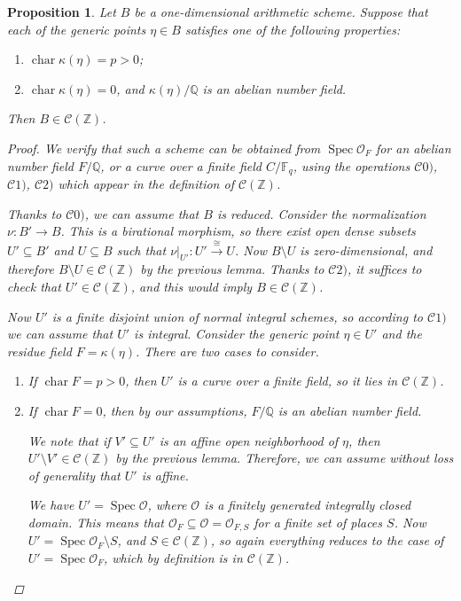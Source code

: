 \documentclass[10pt,a4paper,oneside,draft]{article}
\DeclareMathOperator{\fchar}{char}
\DeclareMathOperator{\Spec}{Spec}
\newcommand{\FF}{\mathbb{F}}
\newcommand{\QQ}{\mathbb{Q}}
\newcommand{\ZZ}{\mathbb{Z}}
\theoremstyle{myplain}
\newtheorem{proposition}[theorem]{Proposition}
\theoremstyle{mydefinition}
\numberwithin{equation}{section}
\begin{document}
\begin{proposition}
  \label{prop:particular-cases-1-dim-base}
  Let $B$ be a one-dimensional arithmetic scheme. Suppose that each of the
  generic points $\eta \in B$ satisfies one of the following properties:
  \begin{enumerate}
  \item[a)] $\fchar \kappa (\eta) = p > 0$;

  \item[b)] $\fchar \kappa (\eta) = 0$, and $\kappa (\eta)/\QQ$ is an abelian
    number field.
  \end{enumerate}
  Then $B \in \mathcal{C} (\ZZ)$.

  \begin{proof}
    We verify that such a scheme can be obtained from $\Spec \mathcal{O}_F$ for
    an abelian number field $F/\QQ$, or a curve over a finite field $C/\FF_q$,
    using the operations $\mathcal{C}0)$, $\mathcal{C}1)$, $\mathcal{C}2)$ which
    appear in the definition of $\mathcal{C} (\ZZ)$.

    Thanks to $\mathcal{C}0)$, we can assume that $B$ is reduced. Consider the
    normalization $\nu\colon B' \to B$. This is a birational morphism, so there
    exist open dense subsets $U' \subseteq B'$ and $U \subseteq B$ such that
    $\left.\nu\right|_{U'}\colon U' \xrightarrow{\cong} U$. Now $B\setminus U$
    is zero-dimensional, and therefore $B\setminus U \in \mathcal{C} (\ZZ)$ by
    the previous lemma. Thanks to $\mathcal{C}2)$, it suffices to check that
    $U' \in \mathcal{C} (\ZZ)$, and this would imply $B \in \mathcal{C} (\ZZ)$.

    Now $U'$ is a finite disjoint union of normal integral schemes, so according
    to $\mathcal{C}1)$ we can assume that $U'$ is integral. Consider the generic
    point $\eta \in U'$ and the residue field $F = \kappa (\eta)$. There are two
    cases to consider.

    \begin{enumerate}
    \item[a)] If $\fchar F = p > 0$, then $U'$ is a curve over a finite field,
      so it lies in $\mathcal{C} (\ZZ)$.

    \item[b)] If $\fchar F = 0$, then by our assumptions, $F/\QQ$ is an abelian
      number field.

      We note that if $V' \subseteq U'$ is an affine open neighborhood of
      $\eta$, then $U'\setminus V' \in \mathcal{C} (\ZZ)$ by the previous
      lemma. Therefore, we can assume without loss of generality that $U'$ is
      affine.

      We have $U' = \Spec \mathcal{O}$, where $\mathcal{O}$ is a finitely
      generated integrally closed domain. This means that
      $\mathcal{O}_F \subseteq \mathcal{O} = \mathcal{O}_{F,S}$ for a finite set
      of places $S$. Now $U' = \Spec \mathcal{O}_F \setminus S$, and
      $S \in \mathcal{C} (\ZZ)$, so again everything reduces to the case of
      $U' = \Spec \mathcal{O}_F$, which by definition is in
      $\mathcal{C} (\ZZ)$. \qedhere
    \end{enumerate}
  \end{proof}
\end{proposition}
\end{document}
